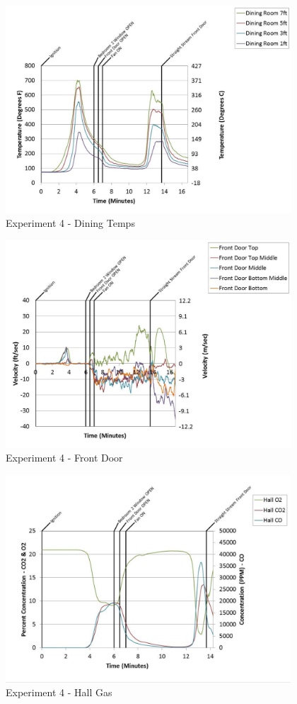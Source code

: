 \documentclass{article}
\begin{document}
\begin{appendices}
	\begin{figure}[h!]
		\centering
		\includegraphics[height=3.05in]{0_Images/Results_Charts/Exp_4_Charts/DiningTemps.pdf}
		\caption{Experiment 4 - Dining Temps}
	\end{figure}
 
	\clearpage

	\begin{figure}[h!]
		\centering
		\includegraphics[height=3.05in]{0_Images/Results_Charts/Exp_4_Charts/FrontDoor.pdf}
		\caption{Experiment 4 - Front Door}
	\end{figure}
 

	\begin{figure}[h!]
		\centering
		\includegraphics[height=3.05in]{0_Images/Results_Charts/Exp_4_Charts/HallGas.pdf}
		\caption{Experiment 4 - Hall Gas}
	\end{figure}
 

\end{appendices}
\end{document}
